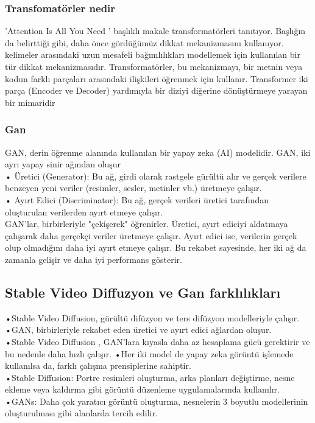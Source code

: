 \documentclass[12pt, a4paper]{article}
\begin{document}
	\subsubsection{Transfomatörler  nedir}	
	'Attention Is All You Need ' başlıklı makale transformatörleri tanıtıyor. Başlığın da belirttiği gibi, daha önce gördüğümüz dikkat mekanizmasını kullanıyor.\cite{transformator2} kelimeler arasındaki uzun mesafeli bağımlılıkları modellemek için kullanılan bir tür dikkat mekanizmasıdır. Transformatörler, bu mekanizmayı, bir metnin veya kodun farklı parçaları arasındaki ilişkileri öğrenmek için kullanır. Transformer  iki parça (Encoder ve Decoder) yardımıyla bir diziyi diğerine dönüştürmeye yarayan bir mimaridir\cite{transformator1}\\
	
	\subsubsection{Gan}		
	GAN, derin öğrenme alanında kullanılan bir yapay zeka (AI) modelidir. GAN, iki ayrı yapay sinir ağından oluşur \\
	•	Üretici (Generator): Bu ağ, girdi olarak rastgele gürültü alır ve gerçek verilere benzeyen yeni veriler (resimler, sesler, metinler vb.) üretmeye çalışır.\\
	•	Ayırt Edici (Discriminator): Bu ağ, gerçek verileri üretici tarafından oluşturulan verilerden ayırt etmeye çalışır.\\
	GAN'lar, birbirleriyle "çekişerek" öğrenirler. Üretici, ayırt ediciyi aldatmaya çalışarak daha gerçekçi veriler üretmeye çalışır. Ayırt edici ise, verilerin gerçek olup olmadığını daha iyi ayırt etmeye çalışır. Bu rekabet sayesinde, her iki ağ da zamanla gelişir ve daha iyi performans gösterir.\cite{Gan-nedir}\\
	
	\subsection{Stable Video Diffuzyon ve Gan farklılıkları}
	•Stable Video Diffusion, gürültü difüzyon ve ters difüzyon modelleriyle çalışır.\\
	•GAN, birbirleriyle rekabet eden üretici ve ayırt edici ağlardan oluşur.\\
	•Stable Video Diffusion , GAN'lara kıyasla daha az hesaplama gücü gerektirir ve bu nedenle daha hızlı çalışır.
	•Her iki model de yapay zeka görüntü işlemede kullanılsa da, farklı çalışma prensiplerine sahiptir.\\
	•Stable Diffusion: Portre resimleri oluşturma, arka planları değiştirme, nesne ekleme veya kaldırma gibi görüntü düzenleme uygulamalarında kullanılır.
	•GANs: Daha çok yaratıcı görüntü oluşturma, nesnelerin 3 boyutlu modellerinin oluşturulması gibi alanlarda tercih edilir. \cite{svd}
	
\end{document}
